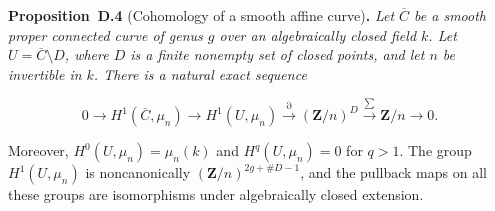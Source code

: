 \documentclass[11pt]{article}
\newenvironment{bpstatement}[2]{\par\addvspace{0.6\baselineskip}\noindent\textbf{#1}#2\textbf{.}\enspace\ignorespaces}
  {\par\addvspace{0.4\baselineskip}}
\newenvironment{bpstatementit}[2]{\begin{bpstatement}{#1}{#2}\itshape\ignorespaces}{\end{bpstatement}}
\begin{document}
\label{bp184}%
\begin{bpstatementit}{Proposition~D.4}{ (Cohomology of a smooth affine curve)}
Let \(\overline C\) be a smooth proper connected curve of genus \(g\) over an algebraically closed field \(k\).  Let \(U=\overline C\setminus D\), where \(D\) is a finite nonempty set of closed points, and let \(n\) be invertible in \(k\).  There is a natural exact sequence

\[
0\longrightarrow H^1(\overline C,\mu_n)
\longrightarrow H^1(U,\mu_n)
\xrightarrow{\partial}(\mathbf Z/n)^D
\xrightarrow{\sum}\mathbf Z/n\longrightarrow0.
\tag{D.1}
\]

Moreover, \(H^0(U,\mu_n)=\mu_n(k)\) and \(H^q(U,\mu_n)=0\) for \(q>1\). The group \(H^1(U,\mu_n)\) is noncanonically \((\mathbf Z/n)^{2g+\#D-1}\), and the pullback maps on all these groups are isomorphisms under algebraically closed extension.
\end{bpstatementit}
\end{document}
